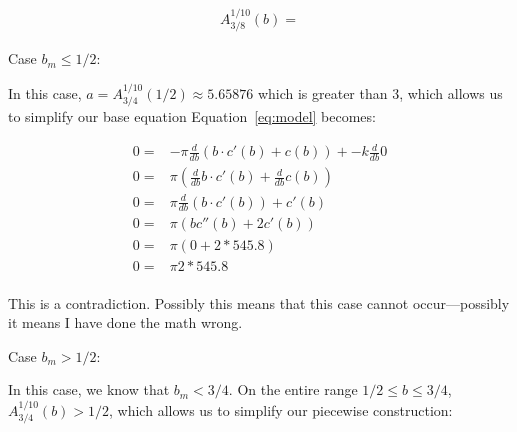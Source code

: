 \documentclass[]{asme2ej}
\begin{document}
\begin{align}
  A_{3/8}^{1/10}(b) =
\end{align}


Case $b_m \leq 1/2$:

In this case, $a = A_{3/4}^{1/10}(1/2) \approx 5.65876$ which is greater than 3, which
allows us to simplify our base equation
Equation~\ref{eq:model} becomes:

\begin{align}
  0 = & - \pi \frac{d}{db} ( b \cdot c'(b) + c(b)) +
  - k \frac{d}{db} 0 \\
  0 = & \pi (\frac{d}{db} b \cdot c'(b) + \frac{d}{db} c(b)) \\
  0 = & \pi \frac{d}{db} (b \cdot c'(b)) +  c'(b) \\
  0 = & \pi (b c''(b) + 2c'(b)) \\
  0 = & \pi (0 + 2 * 545.8) \\
  0 = & \pi 2 * 545.8 \\
  \end{align}

This is a contradiction. Possibly this means that this case cannot occur---possibly it means I have done the math wrong.

Case $b_m > 1/2$:

In this case, we know that $b_m < 3/4$. On the entire range $ 1/2 \leq b \leq 3/4 $, $ A_{3/4}^{1/10}(b) > 1/2$,
which allows us to simplify our piecewise construction:
\end{document}
